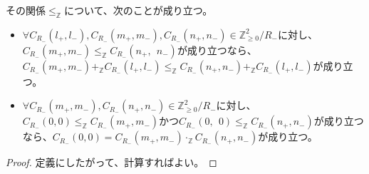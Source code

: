 \documentclass[dvipdfmx]{jsarticle}
\begin{document}
\begin{thm}\label{1.2.6.8}
その関係$\leq_{\mathbb{Z}}$について、次のことが成り立つ。
\begin{itemize}
\item
  $\forall C_{R_{-}}\left( l_{+},l_{-} \right),C_{R_{-}}\left( m_{+},m_{-} \right),C_{R_{-}}\left( n_{+},n_{-} \right) \in \mathbb{Z}_{\geq 0}^{2} /R_{-} $に対し、$C_{R_{-}}\left( m_{+},m_{-} \right) \leq_{\mathbb{Z}}C_{R_{-}}\left( n_{+},\ \ n_{-} \right)$が成り立つなら、$C_{R_{-}}\left( m_{+},m_{-} \right) +_{\mathbb{Z}}C_{R_{-}}\left( l_{+},l_{-} \right) \leq_{\mathbb{Z}}C_{R_{-}}\left( n_{+},n_{-} \right) +_{\mathbb{Z}}C_{R_{-}}\left( l_{+},l_{-} \right)$が成り立つ。
\item
  $\forall C_{R_{-}}\left( m_{+},m_{-} \right),C_{R_{-}}\left( n_{+},n_{-} \right) \in \mathbb{Z}_{\geq 0}^{2} /R_{-} $に対し、$C_{R_{-}}(0,0) \leq_{\mathbb{Z}}C_{R_{-}}\left( m_{+},m_{-} \right)$かつ$C_{R_{-}}(0,\ \ 0) \leq_{\mathbb{Z}}C_{R_{-}}\left( n_{+},n_{-} \right)$が成り立つなら、$C_{R_{-}}(0,0) = C_{R_{-}}\left( m_{+},m_{-} \right) \cdot_{\mathbb{Z}}C_{R_{-}}\left( n_{+},n_{-} \right)$が成り立つ。
\end{itemize}
\end{thm}
\begin{proof}
定義にしたがって、計算すればよい。
\end{proof}
\end{document}
